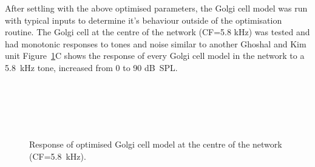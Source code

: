 After settling with the above optimised parameters, the Golgi cell
model was run with typical inputs to determine it's behaviour outside
of the optimisation routine.  The Golgi cell at the centre of the
network (CF=5.8 kHz) was tested and had monotonic responses to tones
and noise similar to another Ghoshal and Kim unit
Figure~\ref{fig:Golgi_verification}C shows the response of every Golgi
cell model in the network to a 5.8~kHz tone, increased from 0 to 90
dB~{SPL}.

\smallskip{}

\begin{figure}[htb]
  \centering
  \hspace{0.5\textwidth}\hfill\\
  \\
  \hfill\\
  \\
 \label{fig:Golgi_verification}
 \caption{Response of optimised Golgi cell model at the centre of the network (CF=5.8~kHz).}
\end{figure}





